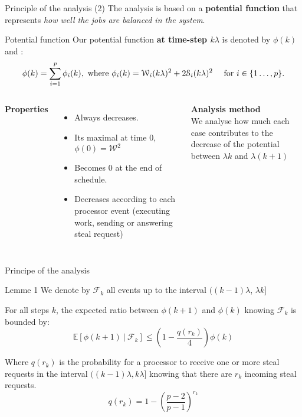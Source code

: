 \documentclass{beamer}
\begin{document}
\begin{frame}{Principle of the analysis (2)}
    The analysis is based on a \textbf{potential function} that represents \textit{how well the jobs are balanced in the system}.
    \begin{block}{Potential function}
    Our potential function \textbf{at time-step \alert{$k\lambda$}} is denoted by $\phi(k)$ and : %
    \begin{equation*}
        \phi(k) = \sum_{i=1}^{p} \phi_i(k),  
        \text{ where $\phi_i(k) =
         \mathcal{W}_{i}(k\lambda)^{2} + 2\mathcal{S}_{i}(k\lambda)^{2}$ \quad for $i\in\{1\dots,p\}$}. 
    \end{equation*}
    \end{block}
    \begin{columns} 
    \textbf{Properties}
    \begin{itemize}
        \item Always decreases. 
        \item Its maximal at time 0, $\phi(0)= \mathcal{W}^2$
        \item Becomes $0$ at the end of schedule. 
        \item Decreases according to each processor event (executing work, sending or answering steal request) 
    \end{itemize}
    \textbf{Analysis method}\\

    \alert{ We analyse how much each case contributes to the decrease of the potential between \alert{$\lambda k$} and \alert{$\lambda(k+1)$}}
    \end{columns}
\end{frame}
\begin{frame}{Principe of the analysis}

\begin{alertblock}{Lemme 1}
    We denote by $\mathcal{F}_{k}$ all events up to the interval $((k-1)\lambda$, $\lambda k$]

        For all steps $k$, the expected ratio between $\phi(k+1)$ and $\phi(k)$ knowing $\mathcal{F}_{k}$ is bounded by: 
        \begin{equation*}
            \mathbb{E}[\phi(k+1) \:|\: \mathcal{F}_{k}] \leq \left(1-\frac{q(r_k)}{4}\right)\phi(k) 
            \label{expdiff}
        \end{equation*}


        Where $q(r_k)$ is the probability for a processor to receive one
        or more steal requests in the interval $((k-1)\lambda,k\lambda]$ knowing that there are $r_k$ incoming steal requests.
        \begin{equation*}
            q(r_k) = 1 - \left(\frac{p-2}{p-1}\right)^{r_k}
            \label{expdiff}
        \end{equation*}
        
        \end{alertblock}
\end{frame}
\end{document}
